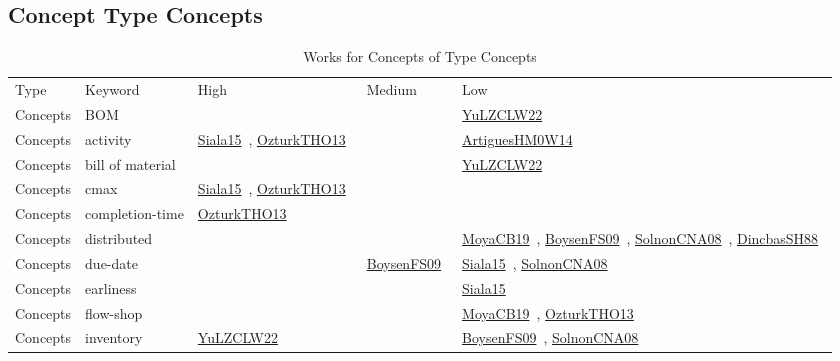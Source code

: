 \clearpage
\subsection{Concept Type Concepts}
\label{sec:Concepts}
{\scriptsize
\begin{longtable}{lp{3cm}>{\raggedright\arraybackslash}p{6cm}>{\raggedright\arraybackslash}p{6cm}>{\raggedright\arraybackslash}p{8cm}}
\rowcolor{white}\caption{Works for Concepts of Type Concepts}\\ \toprule
\rowcolor{white}Type & Keyword & High & Medium & Low\\ \midrule\endhead
\bottomrule
\endfoot
Concepts & BOM &  &  & \href{../cars/works/YuLZCLW22.pdf}{YuLZCLW22}~\cite{YuLZCLW22}\\
Concepts & activity & \href{../cars/works/Siala15.pdf}{Siala15}~\cite{Siala15}, \href{../cars/works/OzturkTHO13.pdf}{OzturkTHO13}~\cite{OzturkTHO13} &  & \href{../cars/works/ArtiguesHM0W14.pdf}{ArtiguesHM0W14}~\cite{ArtiguesHM0W14}\\
Concepts & bill of material &  &  & \href{../cars/works/YuLZCLW22.pdf}{YuLZCLW22}~\cite{YuLZCLW22}\\
Concepts & cmax & \href{../cars/works/Siala15.pdf}{Siala15}~\cite{Siala15}, \href{../cars/works/OzturkTHO13.pdf}{OzturkTHO13}~\cite{OzturkTHO13} &  & \\
Concepts & completion-time & \href{../cars/works/OzturkTHO13.pdf}{OzturkTHO13}~\cite{OzturkTHO13} &  & \\
Concepts & distributed &  &  & \href{../cars/works/MoyaCB19.pdf}{MoyaCB19}~\cite{MoyaCB19}, \href{../cars/works/BoysenFS09.pdf}{BoysenFS09}~\cite{BoysenFS09}, \href{../cars/works/SolnonCNA08.pdf}{SolnonCNA08}~\cite{SolnonCNA08}, \href{../cars/works/DincbasSH88.pdf}{DincbasSH88}~\cite{DincbasSH88}\\
Concepts & due-date &  & \href{../cars/works/BoysenFS09.pdf}{BoysenFS09}~\cite{BoysenFS09} & \href{../cars/works/Siala15.pdf}{Siala15}~\cite{Siala15}, \href{../cars/works/SolnonCNA08.pdf}{SolnonCNA08}~\cite{SolnonCNA08}\\
Concepts & earliness &  &  & \href{../cars/works/Siala15.pdf}{Siala15}~\cite{Siala15}\\
Concepts & flow-shop &  &  & \href{../cars/works/MoyaCB19.pdf}{MoyaCB19}~\cite{MoyaCB19}, \href{../cars/works/OzturkTHO13.pdf}{OzturkTHO13}~\cite{OzturkTHO13}\\
Concepts & inventory & \href{../cars/works/YuLZCLW22.pdf}{YuLZCLW22}~\cite{YuLZCLW22} &  & \href{../cars/works/BoysenFS09.pdf}{BoysenFS09}~\cite{BoysenFS09}, \href{../cars/works/SolnonCNA08.pdf}{SolnonCNA08}~\cite{SolnonCNA08}\\

\end{longtable}}
